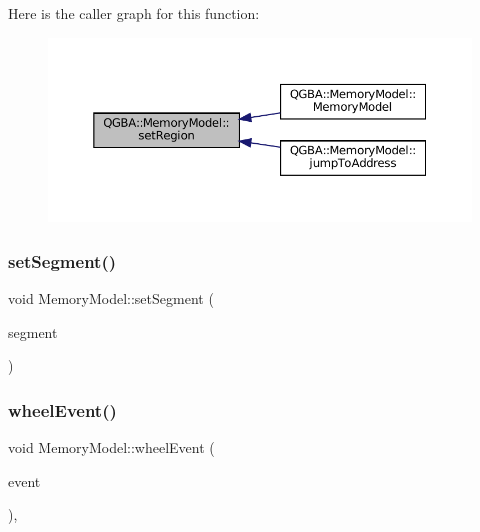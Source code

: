 Here is the caller graph for this function\+:
\nopagebreak
\begin{figure}[H]
\begin{center}
\leavevmode
\includegraphics[width=350pt]{class_q_g_b_a_1_1_memory_model_ab88fae3068abbdbb73095cbb5ef7fc79_icgraph}
\end{center}
\end{figure}
\mbox{\label{class_q_g_b_a_1_1_memory_model_af72ed178d4890921fdabf860139e61fc}} 
\subsubsection{\texorpdfstring{set\+Segment()}{setSegment()}}
{\footnotesize\ttfamily void Memory\+Model\+::set\+Segment (\begin{DoxyParamCaption}\item[{\mbox{\hyperlink{ioapi_8h_a787fa3cf048117ba7123753c1e74fcd6}{int}}}]{segment }\end{DoxyParamCaption})}

\mbox{\label{class_q_g_b_a_1_1_memory_model_aec8b8664b330d0b1aa19548620b0d2e4}} 
\subsubsection{\texorpdfstring{wheel\+Event()}{wheelEvent()}}
{\footnotesize\ttfamily void Memory\+Model\+::wheel\+Event (\begin{DoxyParamCaption}\item[{Q\+Wheel\+Event $\ast$}]{event }\end{DoxyParamCaption})\hspace{0.3cm}{\ttfamily [override]}, {\ttfamily [protected]}}

